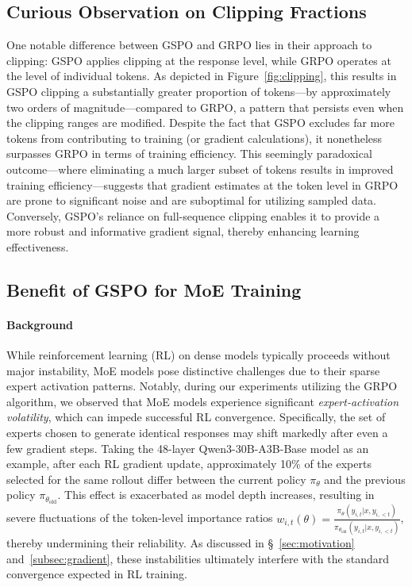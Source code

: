 \subsection{Curious Observation on Clipping Fractions}

One notable difference between GSPO and GRPO lies in their approach to clipping: GSPO applies clipping at the response level, while GRPO operates at the level of individual tokens. As depicted in Figure~\ref{fig:clipping}, this results in GSPO clipping a substantially greater proportion of tokens—by approximately two orders of magnitude—compared to GRPO, a pattern that persists even when the clipping ranges are modified. Despite the fact that GSPO excludes far more tokens from contributing to training (or gradient calculations), it nonetheless surpasses GRPO in terms of training efficiency. This seemingly paradoxical outcome—where eliminating a much larger subset of tokens results in improved training efficiency—suggests that gradient estimates at the token level in GRPO are prone to significant noise and are suboptimal for utilizing sampled data. Conversely, GSPO's reliance on full-sequence clipping enables it to provide a more robust and informative gradient signal, thereby enhancing learning effectiveness.

\subsection{Benefit of GSPO for MoE Training}
\label{subsec:routing_replay}

\paragraph{Background}
While reinforcement learning (RL) on dense models typically proceeds without major instability, MoE models pose distinctive challenges due to their sparse expert activation patterns. Notably, during our experiments utilizing the GRPO algorithm, we observed that MoE models experience significant \textit{expert-activation volatility}, which can impede successful RL convergence. Specifically, the set of experts chosen to generate identical responses may shift markedly after even a few gradient steps. Taking the 48-layer Qwen3-30B-A3B-Base model as an example, after each RL gradient update, approximately 10\% of the experts selected for the same rollout differ between the current policy $\pi_{\theta}$ and the previous policy $\pi_{\theta_\text{old}}$. This effect is exacerbated as model depth increases, resulting in severe fluctuations of the token-level importance ratios $w_{i,t}(\theta) = \frac{ \pi_{\theta} (y_{i,t} | x, y_{i,<t}) }{ \pi_{\theta_\text{old}} (y_{i,t} | x,y_{i,<t})}$, thereby undermining their reliability. As discussed in \S~\ref{sec:motivation} and~\ref{subsec:gradient}, these instabilities ultimately interfere with the standard convergence expected in RL training.

